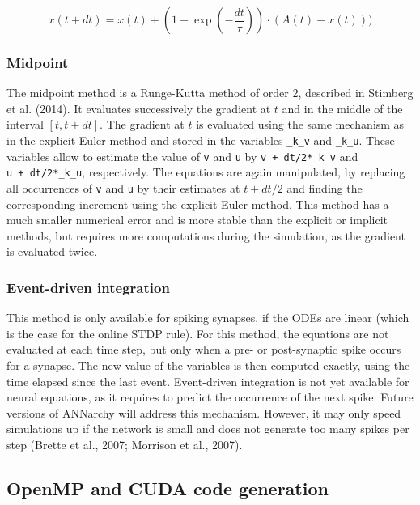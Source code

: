 \documentclass[
  11pt,
  a4paper,
]{scrbook}
\begin{document}
\[ x(t+dt) = x(t) + (1 - \exp(- \frac{dt}{\tau} ) ) \cdot (A(t) - x(t)))\]

\subsubsection*{Midpoint}\label{midpoint}

The midpoint method is a Runge-Kutta method of order 2, described in
Stimberg et al. (2014). It evaluates successively the gradient at \(t\)
and in the middle of the interval \([t, t + dt]\). The gradient at \(t\)
is evaluated using the same mechanism as in the explicit Euler method
and stored in the variables \texttt{\_k\_v} and \texttt{\_k\_u}. These
variables allow to estimate the value of \texttt{v} and \texttt{u} by
\texttt{v\ +\ dt/2*\_k\_v} and \texttt{u\ +\ dt/2*\_k\_u}, respectively.
The equations are again manipulated, by replacing all occurrences of
\texttt{v} and \texttt{u} by their estimates at \(t+dt/2\) and finding
the corresponding increment using the explicit Euler method. This method
has a much smaller numerical error and is more stable than the explicit
or implicit methods, but requires more computations during the
simulation, as the gradient is evaluated twice.

\subsubsection*{Event-driven
integration}\label{event-driven-integration}

This method is only available for spiking synapses, if the ODEs are
linear (which is the case for the online STDP rule). For this method,
the equations are not evaluated at each time step, but only when a pre-
or post-synaptic spike occurs for a synapse. The new value of the
variables is then computed exactly, using the time elapsed since the
last event. Event-driven integration is not yet available for neural
equations, as it requires to predict the occurrence of the next spike.
Future versions of ANNarchy will address this mechanism. However, it may
only speed simulations up if the network is small and does not generate
too many spikes per step (Brette et al., 2007; Morrison et al., 2007).

\subsection{OpenMP and CUDA code
generation}\label{openmp-and-cuda-code-generation}
\end{document}
